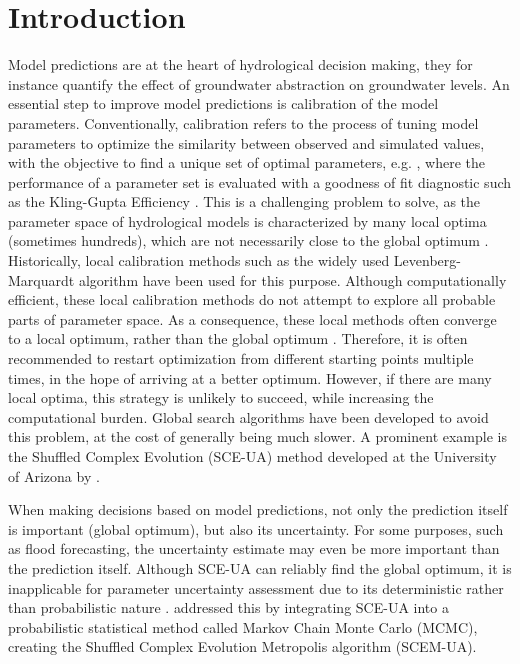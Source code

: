 \section{Introduction}\label{sec1}
Model predictions are at the heart of hydrological decision making, they for instance quantify the effect of groundwater abstraction on groundwater levels. An essential step to improve model predictions is calibration of the model parameters. Conventionally, calibration refers to the process of tuning model parameters to optimize the similarity between observed and simulated values, with the objective to find a unique set of optimal parameters, e.g. \cite{refsgaard1997parameterisation}, where the performance of a parameter set is evaluated with a goodness of fit diagnostic such as the Kling-Gupta Efficiency \citep{gupta2009decomposition}. This is a challenging problem to solve, as the parameter space of hydrological models is characterized by many local optima (sometimes hundreds), which are not necessarily close to the global optimum \citep{duan1992effective}. Historically, local calibration methods such as the widely used Levenberg-Marquardt algorithm \citep{beven1992future} have been used for this purpose. Although computationally efficient, these local calibration methods do not attempt to explore all probable parts of parameter space. As a consequence, these local methods often converge to a local optimum, rather than the global optimum \citep{hendrickson1988comparison, blasone2007parameter}. Therefore, it is often recommended to restart optimization from different starting points multiple times, in the hope of arriving at a better optimum. However, if there are many local optima, this strategy is unlikely to succeed, while increasing the computational burden. Global search algorithms have been developed to avoid this problem, at the cost of generally being much slower. A prominent example is the Shuffled Complex Evolution (SCE-UA) method developed at the University of Arizona by \cite{duan1992effective}. 

When making decisions based on model predictions, not only the prediction itself is important (global optimum), but also its uncertainty. For some purposes, such as flood forecasting, the uncertainty estimate may even be more important than the prediction itself. Although SCE-UA can reliably find the global optimum, it is inapplicable for parameter uncertainty assessment \citep{vrugt2003shuffled} due to its deterministic rather than probabilistic nature \citep{vrugt2006application}. \cite{vrugt2003shuffled} addressed this by integrating SCE-UA into a probabilistic statistical method called Markov Chain Monte Carlo (MCMC), creating the Shuffled Complex Evolution Metropolis algorithm (SCEM-UA). 

